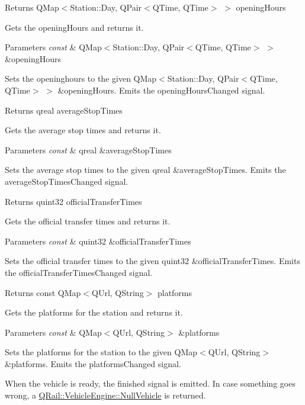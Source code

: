 \begin{DoxyReturn}{Returns}
Q\+Map$<$Station\+::\+Day, Q\+Pair$<$\+Q\+Time, Q\+Time$>$ $>$ opening\+Hours
\end{DoxyReturn}
Gets the opening\+Hours and returns it.


\begin{DoxyParams}{Parameters}
{\em const} & Q\+Map$<$Station\+::\+Day, Q\+Pair$<$\+Q\+Time, Q\+Time$>$ $>$ \&opening\+Hours\\
\hline
\end{DoxyParams}
Sets the openinghours to the given Q\+Map$<$Station\+::\+Day, Q\+Pair$<$\+Q\+Time, Q\+Time$>$ $>$ \&opening\+Hours. Emits the opening\+Hours\+Changed signal.

\begin{DoxyReturn}{Returns}
qreal average\+Stop\+Times
\end{DoxyReturn}
Gets the average stop times and returns it.


\begin{DoxyParams}{Parameters}
{\em const} & qreal \&average\+Stop\+Times\\
\hline
\end{DoxyParams}
Sets the average stop times to the given qreal \&average\+Stop\+Times. Emits the average\+Stop\+Times\+Changed signal.

\begin{DoxyReturn}{Returns}
quint32 official\+Transfer\+Times
\end{DoxyReturn}
Gets the official transfer times and returns it.


\begin{DoxyParams}{Parameters}
{\em const} & quint32 \&official\+Transfer\+Times\\
\hline
\end{DoxyParams}
Sets the official transfer times to the given quint32 \&official\+Transfer\+Times. Emits the official\+Transfer\+Times\+Changed signal.

\begin{DoxyReturn}{Returns}
const Q\+Map$<$\+Q\+Url, Q\+String$>$ platforms
\end{DoxyReturn}
Gets the platforms for the station and returns it.


\begin{DoxyParams}{Parameters}
{\em const} & Q\+Map$<$\+Q\+Url, Q\+String$>$ \&platforms\\
\hline
\end{DoxyParams}
Sets the platforms for the station to the given Q\+Map$<$\+Q\+Url, Q\+String$>$ \&platforms. Emits the platforms\+Changed signal.

When the vehicle is ready, the finished signal is emitted. In case something goes wrong, a \mbox{\hyperlink{classQRail_1_1VehicleEngine_1_1NullVehicle}{Q\+Rail\+::\+Vehicle\+Engine\+::\+Null\+Vehicle}} is returned. 